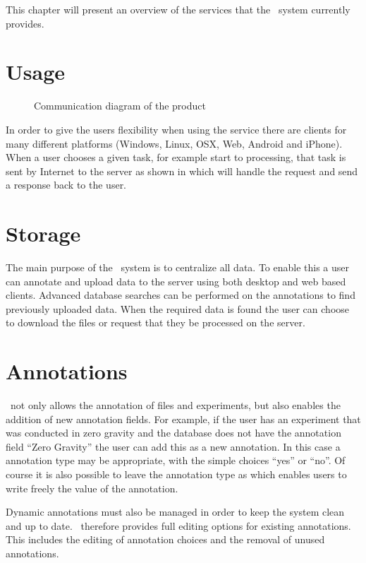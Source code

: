 


This chapter will present an overview of the services that the \appName\ system currently provides. 

\section{Usage}

\begin{figure}[h]
\caption{Communication diagram of the product}
\label{con_serviceDescription}
\end{figure}
	
In order to give the users flexibility when using the service there are clients for many different platforms (Windows, Linux, OSX, Web, Android and iPhone). 
When a user chooses a given task, for example start  to  processing, that task is sent by Internet to the server as shown in  which will handle the request and send a response back to the user.

\section{Storage}
The main purpose of the \appName\ system is to centralize all data. To enable this a user can annotate and upload data to the server using both desktop and web based clients.
Advanced database searches can be performed on the annotations to find previously uploaded data. When the required data is found the user can choose to download the files or request that they be processed on the server.

\section{Annotations}
\appName\  not only allows the annotation of files and experiments, but also enables the addition of new annotation fields. For example, if the user has an experiment that was conducted in zero gravity and the database does not have the annotation field ``Zero Gravity'' the user can add this as a new annotation. In this case a  annotation type may be appropriate, with the simple choices ``yes'' or ``no''. Of course it is also possible to leave the annotation type as  which enables users to write  freely the value of the annotation.

Dynamic annotations must also be managed in order to keep the system clean and up to date. \appName\ therefore provides full editing options for existing annotations. This includes the editing of  annotation choices and the removal of unused annotations.

